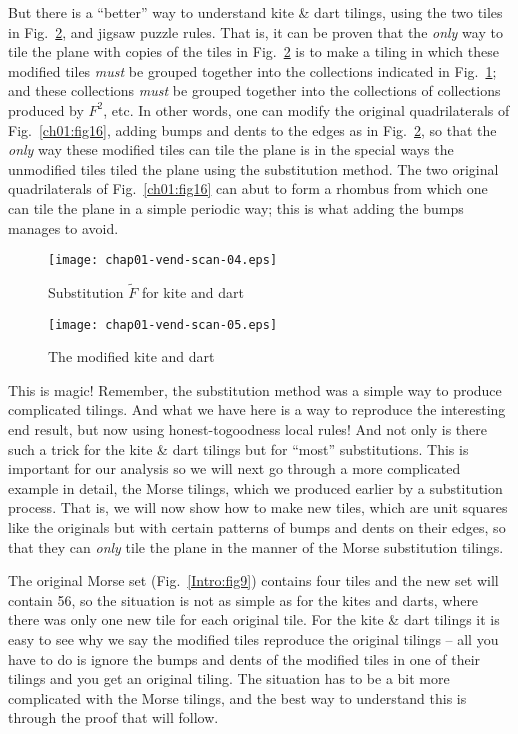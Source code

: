 \documentclass[reqno]{stml-l}
\theoremstyle{plain}
\theoremstyle{definition}
\numberwithin{equation}{chapter}
\begin{document}
But there is a ``better'' way to understand kite \& dart tilings, using the two tiles in Fig.~\ref{ch01:fig18}, and jigsaw puzzle rules. That is, it can be proven \cite{bib:Gar} that the \emph{only} way to tile the plane with copies of the tiles in Fig.~\ref{ch01:fig18} is to make a tiling in which these modified tiles \emph{must} be grouped together into the collections indicated in Fig.~\ref{ch01:fig17};
and these collections \emph{must} be grouped together into the collections of collections produced by $F^{2}$, etc. In other words, one can modify
the original quadrilaterals of Fig.~\ref{ch01:fig16}, adding bumps and dents to the edges as in Fig.~\ref{ch01:fig18}, so that the \emph{only} way these modified tiles can tile the plane is in the special ways the unmodified tiles tiled the plane using the substitution method. The two original quadrilaterals of Fig.~\ref{ch01:fig16} can abut to form a rhombus from which one can tile the plane in a simple periodic way; this is what adding the bumps manages to avoid.
\begin{figure}[!h]
\texttt{[image: chap01-vend-scan-04.eps]}
\caption{Substitution $\tilde{F}$ for kite and
dart}\label{ch01:fig17}
\end{figure}

\begin{figure}[!h]
\texttt{[image: chap01-vend-scan-05.eps]}
\caption{The modified kite and dart }\label{ch01:fig18}
\end{figure}

This is magic! Remember, the substitution method was a simple way to produce complicated tilings. And what we have here is a way to reproduce the interesting end result, but now using honest-togoodness local rules! And not only is there such a trick for the kite \& dart tilings but for ``most'' substitutions. This is important for our analysis so we will next go through a more complicated example in detail, the Morse tilings, which we produced earlier by a substitution process. That is, we will now show how to make new tiles, which are unit squares like the originals but with certain patterns of bumps and dents on their edges, so that they can \emph{only} tile the plane in the manner of the Morse substitution tilings.

The original Morse set (Fig.~\ref{Intro:fig9}) contains four tiles and the new set will contain 56, so the situation is not as simple as for the kites and darts, where there was only one new tile for each original tile. For the kite \& dart tilings it is easy to see why we say the modified tiles reproduce the original tilings -- all you have to do is ignore the bumps and dents of the modified tiles in one of their tilings and you get an original tiling. The situation has to be a bit more complicated with the Morse tilings, and the best way to understand this is through the proof that will follow.
\end{document}
